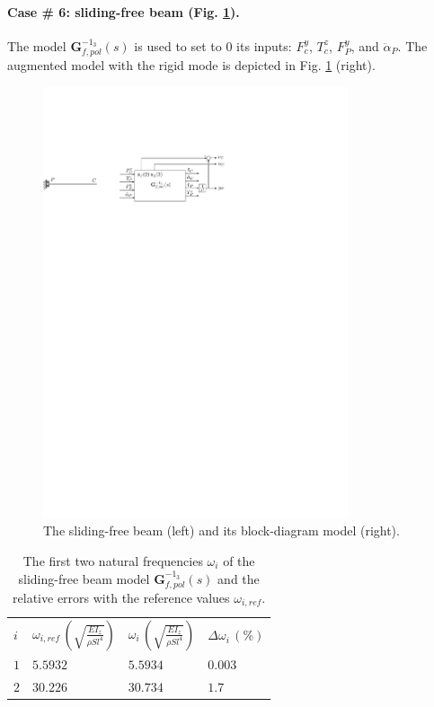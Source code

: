 \documentclass[smallcondensed]{svjour3}     %
\begin{document}
\FloatBarrier
\paragraph{Case \# 6: sliding-free beam (Fig. \ref{fig:Tsf}).} The model $\mathbf{G}_{f,pol}^{-1_{3}}(s)$ is used to set to $0$ its inputs: $F^y_c$, $T^z_c$, $F^y_P$, and $\ddot{\alpha}_P$. The augmented model with the rigid mode is depicted in Fig. \ref{fig:Tsf} (right).
\begin{figure}[htbp!]
  \includegraphics[width=0.8\textwidth]{Tsfb}
\caption{The sliding-free beam (left) and its block-diagram model (right).}
\label{fig:Tsf} 
\end{figure}
\begin{table}[htbp!]
\caption{The first two natural frequencies $\omega_i$ of the sliding-free beam model $\mathbf{G}_{f,pol}^{-1_{3}}(s)$ and the relative errors with the reference values $\omega_{i,ref}$.}
\label{tab:Tsf}       %
\begin{tabular}{llll}
\hline\noalign{\smallskip}
  $i$ & $\omega_{i,ref}\,\left(\sqrt{\frac{EI_z}{\rho S l^4}}\right)$ &  $\omega_i\,\left(\sqrt{\frac{EI_z}{\rho S l^4}}\right)$ &  $\Delta \omega_i\,(\%)$ \\
\noalign{\smallskip}\hline\noalign{\smallskip}
$1$ & $5.5932$ & $5.5934$  & $0.003$ \\ 
$2$ & $30.226$ & $30.734$ & $1.7$ \\
\hline
\end{tabular}
\end{table}
\end{document}
